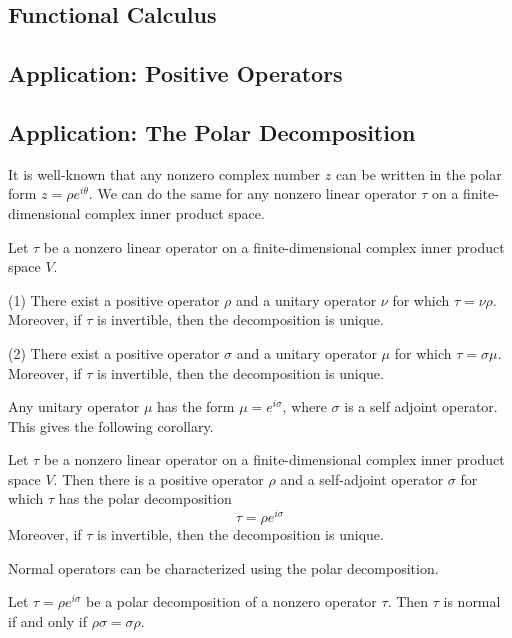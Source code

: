 \subsection{Functional Calculus}


\subsection{Application: Positive Operators}



\subsection{Application: The Polar Decomposition}
It is well-known that any nonzero complex number $z$ can be written in the polar form $z=\rho e^{i\theta}$. We can do the same for any nonzero linear operator $\tau$ on a finite-dimensional complex inner product space.
\begin{theorem}
Let $\tau$ be a nonzero linear operator on a finite-dimensional complex inner product space $V$.\par
(1) There exist a positive operator $\rho$ and a unitary operator $\nu$ for which $\tau=\nu\rho$. Moreover, if $\tau$ is invertible, then the decomposition is unique.\par
(2) There exist a positive operator $\sigma$ and a unitary operator $\mu$ for which $\tau=\sigma\mu$. Moreover, if $\tau$ is invertible, then the decomposition is unique.
\end{theorem}
Any unitary operator $\mu$ has the form $\mu=e^{i\sigma}$, where $\sigma$ is a self adjoint operator. This gives the following corollary.
\begin{corollary}
Let $\tau$ be a nonzero linear operator on a finite-dimensional complex inner product space $V$. Then there is a positive operator $\rho$ and a self-adjoint operator $\sigma$ for which $\tau$ has the polar decomposition \[\tau=\rho e^{i\sigma}\]
Moreover, if $\tau$ is invertible, then the decomposition is unique.
\end{corollary}
Normal operators can be characterized using the polar decomposition.
\begin{theorem}
Let $\tau=\rho e^{i\sigma}$ be a polar decomposition of a nonzero operator $\tau$. Then $\tau$ is normal if and only if $\rho\sigma=\sigma\rho$.
\end{theorem}

